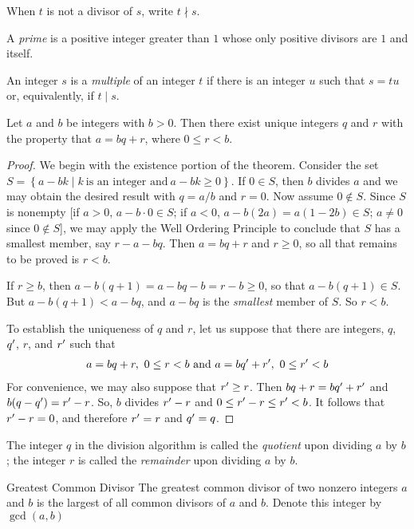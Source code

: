 \documentclass[../butidigress.tex]{subfiles}
\begin{document}
When $t$ is not a divisor of $s$, write $t\nmid s$.

A \emph{prime} is a positive integer greater than $1$ whose only positive divisors are $1$ and itself.

An integer $s$ is a \emph{multiple} of an integer $t$ if there is an integer $u$ such that $s=tu$ or, equivalently, if $t\mid s$.

\begin{theorem}
Let $a$ and $b$ be integers with $b>0$.
Then there exist unique integers $q$ and $r$ with the property that $a=bq+r$, where $0\leq r<b$.
\end{theorem}

\begin{proof}
We begin with the existence portion of the theorem.
Consider the set $S = \left\{a - bk\mid k\ \text{is an integer and}\ a - bk \geq 0 \right\}$.
If $0 \in S$, then $b$ divides $a$ and we may obtain the desired result with $q = a/b$ and $r = 0$.
Now assume $0 \notin S$.
Since $S$ is nonempty [if $a>0$, $a-b\cdot 0 \in S$; if $a < 0$, $a - b(2a) = a(1 - 2b) \in S$; $a \neq 0$ since $0 \notin S$], we may apply the Well Ordering Principle to conclude that $S$ has a smallest member, say $r - a - bq$.
Then $a = bq + r$ and $r \geq 0$, so all that remains to be proved is $r < b$.

If $r \geq b$, then $a - b(q + 1) = a - bq - b = r - b \geq 0$, so that $a - b(q + 1) \in S$.
But $a - b(q + 1) < a - bq$, and $a - bq$ is the \emph{smallest} member of $S$.
So $r < b$.

To establish the uniqueness of $q$ and $r$, let us suppose that there are integers, $q$, ${q}^{\prime}$, $r$, and ${r}^{\prime}$ such that
\begin{align*}
a = bq + r,\ 0\leq r < b\ \text{and}\ a = b\vprime{q} + \vprime{r},\ 0 \leq \vprime{r} < b
\end{align*}
For convenience, we may also suppose that ${r}^{\prime} \geq r$.
Then $bq + r = b{q}^{\prime} + {r}^{\prime}$ and $b(q - {q}^{\prime}) = {r}^{\prime} - r$.
So, $b$ divides ${r}^{\prime} - r$ and $0 \leq {r}^{\prime} - r \leq {r}^{\prime} < b$.
It follows that ${r}^{\prime} - r = 0$, and therefore ${r}^{\prime} = r$ and ${q}^{\prime} = q$.
\end{proof}

The integer $q$ in the division algorithm is called the \emph{quotient} upon dividing $a$ by $b$; the integer $r$ is called the \emph{remainder} upon dividing $a$ by $b$.

\begin{definition}{Greatest Common Divisor}
The greatest common divisor of two nonzero integers $a$ and $b$ is the largest of all common divisors of $a$ and $b$.
Denote this integer by $\gcd(a, b)$
\end{definition}
\end{document}
